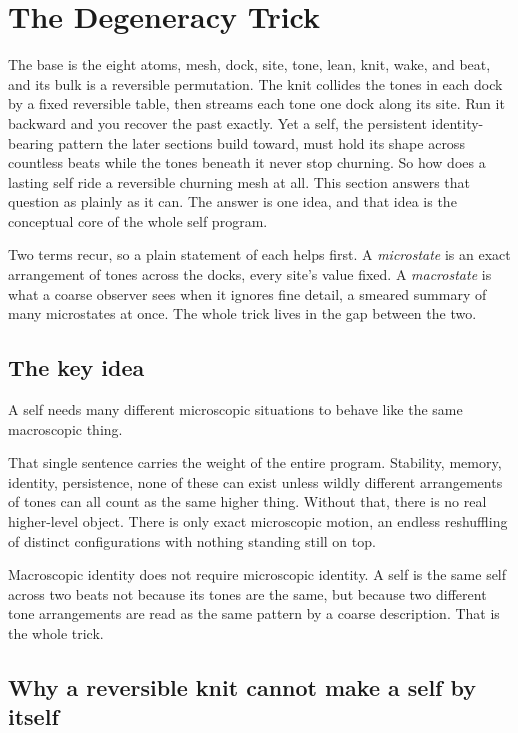 \section{The Degeneracy Trick}

The base is the eight atoms, mesh, dock, site, tone, lean, knit, wake, and beat, and its bulk is a reversible permutation. The knit collides the tones in each dock by a fixed reversible table, then streams each tone one dock along its site. Run it backward and you recover the past exactly. Yet a self, the persistent identity-bearing pattern the later sections build toward, must hold its shape across countless beats while the tones beneath it never stop churning. So how does a lasting self ride a reversible churning mesh at all. This section answers that question as plainly as it can. The answer is one idea, and that idea is the conceptual core of the whole self program.

Two terms recur, so a plain statement of each helps first. A \emph{microstate} is an exact arrangement of tones across the docks, every site's value fixed. A \emph{macrostate} is what a coarse observer sees when it ignores fine detail, a smeared summary of many microstates at once. The whole trick lives in the gap between the two.

\subsection{The key idea}

A self needs many different microscopic situations to behave like the same macroscopic thing.

That single sentence carries the weight of the entire program. Stability, memory, identity, persistence, none of these can exist unless wildly different arrangements of tones can all count as the same higher thing. Without that, there is no real higher-level object. There is only exact microscopic motion, an endless reshuffling of distinct configurations with nothing standing still on top.

\begin{principle}
Macroscopic identity does not require microscopic identity. A self is the same self across two beats not because its tones are the same, but because two different tone arrangements are read as the same pattern by a coarse description. That is the whole trick.
\end{principle}

\subsection{Why a reversible knit cannot make a self by itself}

